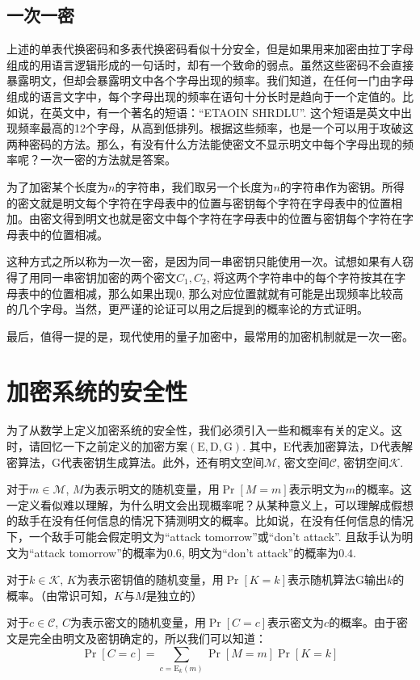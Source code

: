 \documentclass[UTF8]{ctexrep}
\def\pth#1{\left( {#1}\right)}
\def\brack#1{\left[ {#1}\right]}
\def\E#1#2{{\mathrm{E}_{#1}\left({#2}\right)}}
\begin{document}
\subsection{一次一密}
上述的单表代换密码和多表代换密码看似十分安全，但是如果用来加密由拉丁字母组成的用语言逻辑形成的一句话时，却有一个致命的弱点。虽然这些密码不会直接暴露明文，但却会暴露明文中各个字母出现的频率。我们知道，在任何一门由字母组成的语言文字中，每个字母出现的频率在语句十分长时是趋向于一个定值的。比如说，在英文中，有一个著名的短语：``ETAOIN SHRDLU''. 这个短语是英文中出现频率最高的12个字母，从高到低排列。根据这些频率，也是一个可以用于攻破这两种密码的方法。那么，有没有什么方法能使密文不显示明文中每个字母出现的频率呢？一次一密的方法就是答案。\par
为了加密某个长度为$n$的字符串，我们取另一个长度为$n$的字符串作为密钥。所得的密文就是明文每个字符在字母表中的位置与密钥每个字符在字母表中的位置相加。由密文得到明文也就是密文中每个字符在字母表中的位置与密钥每个字符在字母表中的位置相减。\par
这种方式之所以称为一次一密，是因为同一串密钥只能使用一次。试想如果有人窃得了用同一串密钥加密的两个密文$C_1, C_2$, 将这两个字符串中的每个字符按其在字母表中的位置相减，那么如果出现$0$, 那么对应位置就就有可能是出现频率比较高的几个字母。当然，更严谨的论证可以用之后提到的概率论的方式证明。\par
最后，值得一提的是，现代使用的量子加密中，最常用的加密机制就是一次一密。
\section{加密系统的安全性}
为了从数学上定义加密系统的安全性，我们必须引入一些和概率有关的定义。这时，请回忆一下之前定义的加密方案$\pth{\mathrm{E}, \mathrm{D}, \mathrm{G}}$. 其中，$\mathrm{E}$代表加密算法，$\mathrm{D}$代表解密算法，$\mathrm{G}$代表密钥生成算法。此外，还有明文空间$\mathcal{M}$, 密文空间$\mathcal{C}$, 密钥空间$\mathcal{K}$.\par
对于$m\in\mathcal{M}$, $M$为表示明文的随机变量，用$\Pr\brack{M=m}$表示明文为$m$的概率。这一定义看似难以理解，为什么明文会出现概率呢？从某种意义上，可以理解成假想的敌手在没有任何信息的情况下猜测明文的概率。比如说，在没有任何信息的情况下，一个敌手可能会假定明文为``attack tomorrow''或``don't attack''. 且敌手认为明文为``attack tomorrow''的概率为$0.6$, 明文为``don't attack''的概率为$0.4$.\par
对于$k\in\mathcal{K}$, $K$为表示密钥值的随机变量，用$\Pr\brack{K=k}$表示随机算法$\mathrm{G}$输出$k$的概率。（由常识可知，$K$与$M$是独立的）\par
对于$c\in\mathcal{C}$, $C$为表示密文的随机变量，用$\Pr\brack{C=c}$表示密文为$c$的概率。由于密文是完全由明文及密钥确定的，所以我们可以知道：
\begin{equation}
    \Pr\brack{C=c}=\sum_{c=\E{k}{m}} \Pr\brack{M=m}\Pr\brack{K=k}
\end{equation}
\end{document}
